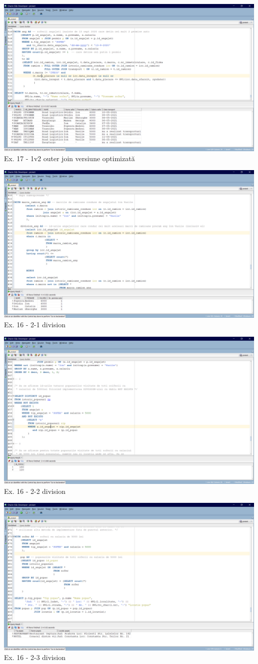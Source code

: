 \documentclass[12pt, a4paper]{article}
\begin{document}
\includegraphics[width=\textwidth]{outer_join_2.png}
\label{Ex16 1-2}
\centering Ex. 17 - 1v2 outer join versiune optimizată

\includegraphics[width=\textwidth]{division_1.png}
\label{Ex16 2-1}
\centering Ex. 16 - 2-1 division

\includegraphics[width=\textwidth]{division_2.png}
\label{Ex16 2-2}
\centering Ex. 16 - 2-2 division

\includegraphics[width=\textwidth]{division_3.png}
\label{Ex16 2-3}
\centering Ex. 16 - 2-3 division
\end{document}
